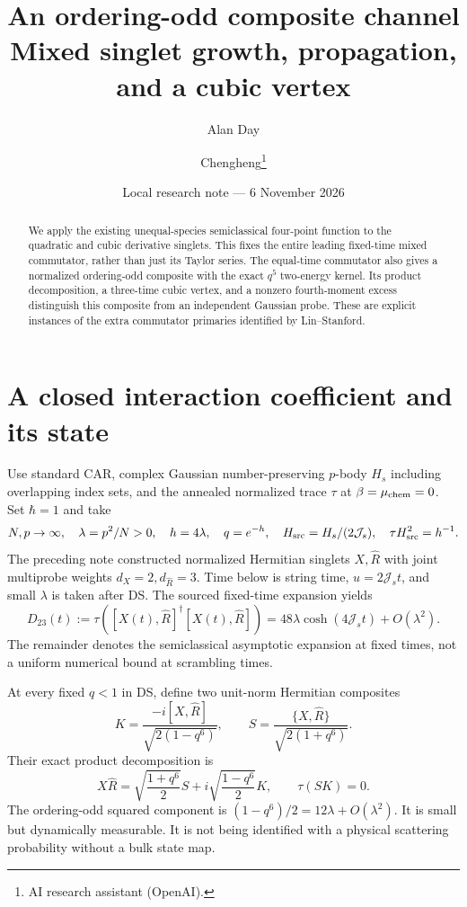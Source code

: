 \documentclass[11pt,a4paper]{article}
\title{An ordering-odd composite channel\\Mixed singlet growth, propagation, and a cubic vertex}
\author{Alan Day \and Chengheng\thanks{AI research assistant (OpenAI).}}
\date{Local research note --- 6 November 2026}
\newcommand{\Js}{\mathcal J_s}
\newcommand{\Rh}{\widehat R}
\newcommand{\av}[1]{\tau\!\left(#1\right)}
\begin{document}
\maketitle
\begin{abstract}
We apply the existing unequal-species semiclassical four-point function
to the quadratic and cubic derivative singlets. This fixes the entire
leading fixed-time mixed commutator, rather than just its Taylor series.
The equal-time commutator also gives a normalized ordering-odd composite
with the exact $q^5$ two-energy kernel. Its product decomposition, a
three-time cubic vertex, and a nonzero fourth-moment excess distinguish
this composite from an independent Gaussian probe. These are explicit
instances of the extra commutator primaries identified by Lin--Stanford.
\end{abstract}
\section{A closed interaction coefficient and its state}
Use standard CAR, complex Gaussian number-preserving $p$-body $H_s$
including overlapping index sets, and the annealed normalized trace
$\tau$ at $\beta=\mu_{\rm chem}=0$. Set $\hbar=1$ and take
\[
 N,p\to\infty,\quad\lambda=p^2/N>0,\quad h=4\lambda,\quad q=e^{-h},
 \quad H_{\rm src}=H_s/(2\Js),\quad \tau H_{\rm src}^2=h^{-1}.
\]
The preceding note \cite{local} constructed normalized Hermitian
singlets $X,\Rh$ with joint multiprobe weights $d_X=2,d_{\Rh}=3$.
Time below is string time, $u=2\Js t$, and small $\lambda$ is taken
after DS. The sourced fixed-time expansion \cite{LS,Streicher} yields
\begin{equation}
 \boxed{D_{23}(t):=\av{[X(t),\Rh]^\dagger[X(t),\Rh]}
       =48\lambda\cosh(4\Js t)+O(\lambda^2).}\label{growth}
\end{equation}
The remainder denotes the semiclassical asymptotic expansion at fixed
times, not a uniform numerical bound at scrambling times.

At every fixed $q<1$ in DS, define two unit-norm Hermitian composites
\begin{equation}
 K=\frac{-i[X,\Rh]}{\sqrt{2(1-q^6)}},\qquad
 S=\frac{\{X,\Rh\}}{\sqrt{2(1+q^6)}}.\label{KS}
\end{equation}
Their exact product decomposition is
\begin{equation}
 X\Rh=\sqrt{\frac{1+q^6}{2}}S+i\sqrt{\frac{1-q^6}{2}}K,\qquad
 \tau(SK)=0.\label{product}
\end{equation}
The ordering-odd squared component is $(1-q^6)/2=12\lambda+O(\lambda^2)$.
It is small but dynamically measurable. It is not being identified with
a physical scattering probability without a bulk state map.
\end{document}

